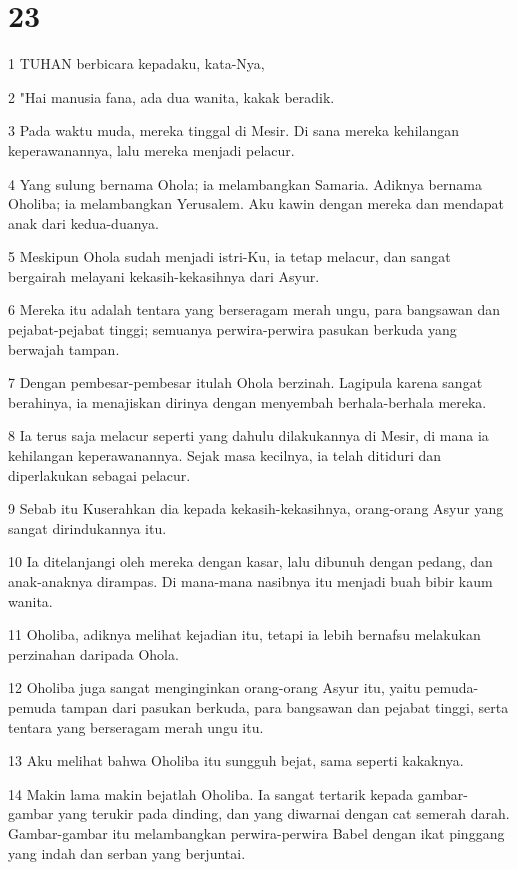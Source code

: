 \chapter{23}

\par 1 TUHAN berbicara kepadaku, kata-Nya,
\par 2 "Hai manusia fana, ada dua wanita, kakak beradik.
\par 3 Pada waktu muda, mereka tinggal di Mesir. Di sana mereka kehilangan keperawanannya, lalu mereka menjadi pelacur.
\par 4 Yang sulung bernama Ohola; ia melambangkan Samaria. Adiknya bernama Oholiba; ia melambangkan Yerusalem. Aku kawin dengan mereka dan mendapat anak dari kedua-duanya.
\par 5 Meskipun Ohola sudah menjadi istri-Ku, ia tetap melacur, dan sangat bergairah melayani kekasih-kekasihnya dari Asyur.
\par 6 Mereka itu adalah tentara yang berseragam merah ungu, para bangsawan dan pejabat-pejabat tinggi; semuanya perwira-perwira pasukan berkuda yang berwajah tampan.
\par 7 Dengan pembesar-pembesar itulah Ohola berzinah. Lagipula karena sangat berahinya, ia menajiskan dirinya dengan menyembah berhala-berhala mereka.
\par 8 Ia terus saja melacur seperti yang dahulu dilakukannya di Mesir, di mana ia kehilangan keperawanannya. Sejak masa kecilnya, ia telah ditiduri dan diperlakukan sebagai pelacur.
\par 9 Sebab itu Kuserahkan dia kepada kekasih-kekasihnya, orang-orang Asyur yang sangat dirindukannya itu.
\par 10 Ia ditelanjangi oleh mereka dengan kasar, lalu dibunuh dengan pedang, dan anak-anaknya dirampas. Di mana-mana nasibnya itu menjadi buah bibir kaum wanita.
\par 11 Oholiba, adiknya melihat kejadian itu, tetapi ia lebih bernafsu melakukan perzinahan daripada Ohola.
\par 12 Oholiba juga sangat menginginkan orang-orang Asyur itu, yaitu pemuda-pemuda tampan dari pasukan berkuda, para bangsawan dan pejabat tinggi, serta tentara yang berseragam merah ungu itu.
\par 13 Aku melihat bahwa Oholiba itu sungguh bejat, sama seperti kakaknya.
\par 14 Makin lama makin bejatlah Oholiba. Ia sangat tertarik kepada gambar-gambar yang terukir pada dinding, dan yang diwarnai dengan cat semerah darah. Gambar-gambar itu melambangkan perwira-perwira Babel dengan ikat pinggang yang indah dan serban yang berjuntai.
